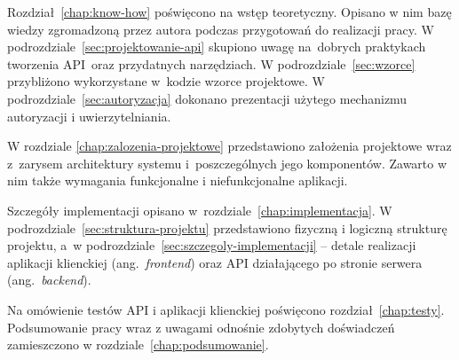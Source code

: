 Rozdział~\ref{chap:know-how} poświęcono na wstęp teoretyczny. Opisano w nim bazę wiedzy zgromadzoną przez autora podczas przygotowań do realizacji pracy. W podrozdziale~\ref{sec:projektowanie-api} skupiono uwagę na~dobrych praktykach tworzenia API~oraz przydatnych narzędziach. W podrozdziale~\ref{sec:wzorce} przybliżono wykorzystane w~kodzie wzorce projektowe. W podrozdziale~\ref{sec:autoryzacja} dokonano prezentacji użytego mechanizmu autoryzacji i uwierzytelniania.

W rozdziale \ref{chap:zalozenia-projektowe} przedstawiono założenia projektowe wraz z~zarysem architektury systemu i~poszczególnych jego komponentów. Zawarto w nim także wymagania funkcjonalne i niefunkcjonalne aplikacji.

Szczegóły implementacji opisano w~rozdziale~\ref{chap:implementacja}. W podrozdziale~\ref{sec:struktura-projektu} przedstawiono fizyczną i logiczną strukturę projektu, a~w podrozdziale~\ref{sec:szczegoly-implementacji} -- detale realizacji aplikacji klienckiej (ang.~\emph{frontend}) oraz API działającego po stronie serwera (ang.~\emph{backend}).

Na omówienie testów API i aplikacji klienckiej poświęcono rozdział~\ref{chap:testy}. Podsumowanie pracy wraz z uwagami odnośnie zdobytych doświadczeń zamieszczono w rozdziale~\ref{chap:podsumowanie}.
